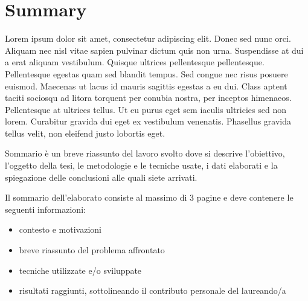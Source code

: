 \chapter*{Summary} %
\label{sommario}


Lorem ipsum dolor sit amet, consectetur adipiscing elit. Donec sed nunc orci. Aliquam nec nisl vitae sapien pulvinar dictum quis non urna. Suspendisse at dui a erat aliquam vestibulum. Quisque ultrices pellentesque pellentesque. Pellentesque egestas quam sed blandit tempus. Sed congue nec risus posuere euismod. Maecenas ut lacus id mauris sagittis egestas a eu dui. Class aptent taciti sociosqu ad litora torquent per conubia nostra, per inceptos himenaeos. Pellentesque at ultrices tellus. Ut eu purus eget sem iaculis ultricies sed non lorem. Curabitur gravida dui eget ex vestibulum venenatis. Phasellus gravida tellus velit, non eleifend justo lobortis eget.


  Sommario è un breve riassunto del lavoro svolto dove si descrive l'obiettivo, l'oggetto della tesi, le 
metodologie e le tecniche usate, i dati elaborati e la spiegazione delle conclusioni alle quali siete arrivati.  

Il sommario dell’elaborato consiste al massimo di 3 pagine e deve contenere le seguenti informazioni:
\begin{itemize}
  \item contesto e motivazioni 
  \item breve riassunto del problema affrontato
  \item tecniche utilizzate e/o sviluppate
  \item risultati raggiunti, sottolineando il contributo personale del laureando/a
\end{itemize}




